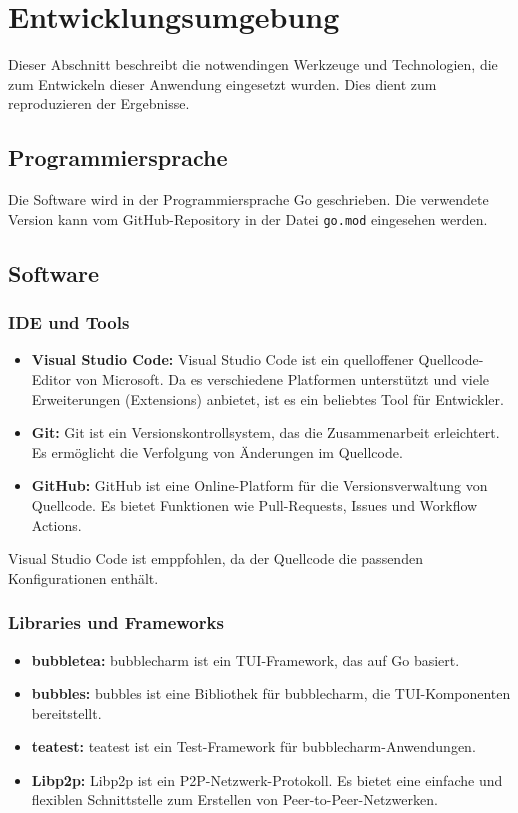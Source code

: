 \section{Entwicklungsumgebung}

Dieser Abschnitt beschreibt die notwendingen Werkzeuge und Technologien, die zum Entwickeln dieser Anwendung eingesetzt wurden.
Dies dient zum reproduzieren der Ergebnisse. 


\subsection{Programmiersprache}

Die Software wird in der Programmiersprache Go geschrieben.
Die verwendete Version kann vom GitHub-Repository in der Datei \texttt{go.mod} eingesehen werden.


\subsection{Software}


\subsubsection{IDE und Tools}

\begin{itemize}
    \item \textbf{Visual Studio Code:} Visual Studio Code ist ein quelloffener Quellcode-Editor von Microsoft. Da es verschiedene Platformen unterstützt und viele Erweiterungen (Extensions) anbietet, ist es ein beliebtes Tool für Entwickler.
    \item \textbf{Git:} Git ist ein Versionskontrollsystem, das die Zusammenarbeit erleichtert. Es ermöglicht die Verfolgung von Änderungen im Quellcode.
    \item \textbf{GitHub:} GitHub ist eine Online-Platform für die Versionsverwaltung von Quellcode. Es bietet Funktionen wie Pull-Requests, Issues und Workflow Actions.
\end{itemize}

Visual Studio Code ist emppfohlen, da der Quellcode die passenden Konfigurationen enthält.


\subsubsection{Libraries und Frameworks}

\begin{itemize}
    \item \textbf{bubbletea:} bubblecharm ist ein TUI-Framework, das auf Go basiert. \cite{bubbletea}
    \item \textbf{bubbles:} bubbles ist eine Bibliothek für bubblecharm, die TUI-Komponenten bereitstellt. \cite{bubbles}
    \item \textbf{teatest:} teatest ist ein Test-Framework für bubblecharm-Anwendungen. \cite{teatest_docs}
    \item \textbf{Libp2p:} Libp2p ist ein P2P-Netzwerk-Protokoll. Es bietet eine einfache und flexiblen Schnittstelle zum Erstellen von Peer-to-Peer-Netzwerken. \cite{libp2p_go_getting_started}
\end{itemize}


